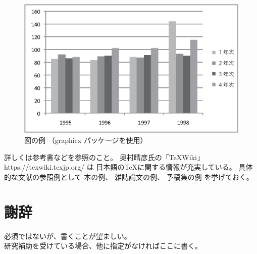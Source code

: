 \documentclass[a4paper,11pt]{jreport}
\begin{document}
\begin{figure}[htbp]
\begin{center}
\includegraphics[scale=0.6]{sample.eps}
\end{center}
\caption{図の例 （graphicx パッケージを使用）}
\label{figure:sample}
\end{figure}

詳しくは参考書\cite{okumura2010,yoshinaga2009}などを参照のこと。
奥村晴彦氏の「\TeX Wiki」 https://texwiki.texjp.org/ は
日本語の\TeX に関する情報が充実している。
具体的な文献の参照例として
本の例\cite{ware2004}、
雑誌論文の例\cite{meyer2009}、
予稿集の例\cite{hill2010}
を挙げておく。

\chapter*{謝辞}

必須ではないが、書くことが望ましい。
\\
研究補助を受けている場合、他に指定がなければここに書く。

\newpage

\renewcommand{\bibname}{参考文献}

%
%


\end{document}
